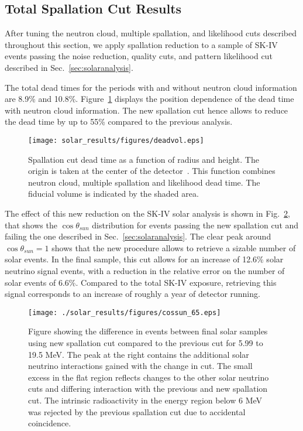 \subsection{Total Spallation Cut Results}
After tuning the neutron cloud, multiple spallation, and likelihood cuts described throughout this section, we apply spallation reduction to a sample of SK-IV events passing the noise reduction, quality cuts, and pattern likelihood cut described in Sec.~\ref{sec:solaranalysis}.

The total dead times for the periods with and without neutron cloud information are 8.9\% and 10.8\%. Figure~\ref{fig:deadvol} displays the position dependence of the dead time with neutron cloud information. The new spallation cut hence allows to reduce the dead time by up to 55\% compared to the previous analysis.

\begin{figure}
    \centering
    \texttt{[image: solar\_results/figures/deadvol.eps]} %
    \caption{Spallation cut dead time as a function of radius and height. The origin is taken at the center of the detector~\cite{skdetector}. This function combines neutron cloud, multiple spallation and likelihood dead time. The fiducial volume is indicated by the shaded area.}
    \label{fig:deadvol}
\end{figure}

The effect of this new reduction on the SK-IV solar analysis is shown in Fig.~\ref{fig:coscompdiff}, that shows the $\cos\theta_{sun}$ distribution for events passing the new spallation cut and failing the one described in Sec.~\ref{sec:solaranalysis}. The clear peak around $\cos\theta_{sun} = 1$ shows that the new procedure allows to retrieve a sizable number of solar events. In the final sample, this cut allows for an increase of 12.6\% solar neutrino signal events, with a reduction in the relative error on the number of solar events of 6.6\%. Compared to the total SK-IV exposure, retrieving this signal corresponds to an increase of roughly a year of detector running.


\begin{figure}
    \centering
    \texttt{[image: ./solar\_results/figures/cossun\_65.eps]}
    \caption{Figure showing the difference in events between final solar samples using new spallation cut compared to the previous cut for 5.99 to 19.5 MeV. The peak at the right contains the additional solar neutrino interactions gained with the change in cut. The small excess in the flat region reflects changes to the other solar neutrino cuts and differing interaction with the previous and new spallation cut. The intrinsic radioactivity in the energy region below 6 MeV was rejected by the previous spallation cut due to accidental coincidence.}
    \label{fig:coscompdiff}
\end{figure}
